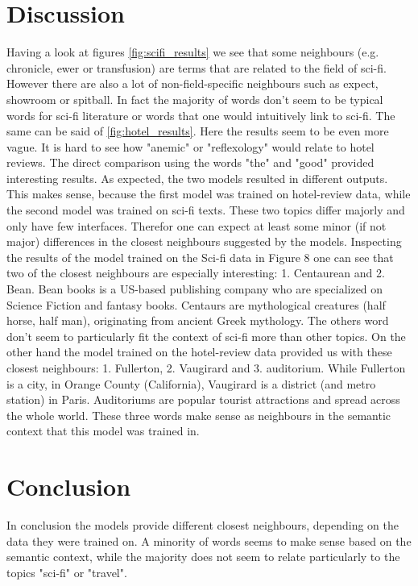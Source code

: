 \documentclass[fleqn,10pt]{SelfArx} %
\begin{document}
\section{Discussion}
Having a look at figures \ref{fig:scifi_results} we see that some neighbours (e.g. chronicle, ewer or transfusion) are terms that are related to the field of sci-fi. However there are also a lot of non-field-specific neighbours such as expect, showroom or spitball. In fact the majority of words don't seem to be typical words for sci-fi literature or words that one would intuitively link to sci-fi. The same can be said of \ref{fig:hotel_results}. Here the results seem to be even more vague. It is hard to see how "anemic" or "reflexology" would relate to hotel reviews.
\newline
\newline
The direct comparison using the words "the" and "good" provided interesting results. As expected, the two models resulted in different outputs. This makes sense, because the first model was trained on hotel-review data, while the second model was trained on sci-fi texts. These two topics differ majorly and only have few interfaces. Therefor one can expect at least some minor (if not major) differences in the closest neighbours suggested by the models.
\newline
\newline
Inspecting the results of the model trained on the Sci-fi data in Figure 8 one can see that two of the closest neighbours are especially interesting: 1. Centaurean and 2. Bean. Bean books is a US-based publishing company who are specialized on Science Fiction and fantasy books. Centaurs are mythological creatures (half horse, half man), originating from ancient Greek mythology. The others word don't seem to particularly fit the context of sci-fi more than other topics.
\newline
\newline
On the other hand the model trained on the hotel-review data provided us with these closest neighbours: 1. Fullerton, 2. Vaugirard and 3. auditorium. While Fullerton is a city, in Orange County (California), Vaugirard is a district (and metro station) in Paris. Auditoriums are popular tourist attractions and spread across the whole world. These three words make sense as neighbours in the semantic context that this model was trained in.

\section{Conclusion}
In conclusion the models provide different closest neighbours, depending on the data they were trained on. A minority of words seems to make sense based on the semantic context, while the majority does not seem to relate particularly to the topics "sci-fi" or "travel".
\end{document}
